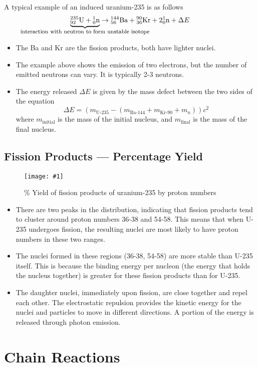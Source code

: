 \documentclass[a4paper,12pt]{article}
\let\oldsection\section
\renewcommand\section{\clearpage\oldsection}
\newcommand{\img}[4]{\begin{center}
  \begin{figure}[H]
    \centering
    \texttt{[image: \#1]}
    \caption{#3}
    \label{fig:#4}
  \end{figure}
\end{center}}
\newcommand{\paren}[1]{\left(#1\right)}
\newcommand{\atom}[3]{{}^{#1}_{#2}\text{#3}}
\begin{document}
A typical example of an induced uranium-235 is as follows
$$\underbrace{\atom{235}{92}{U} + \atom{1}{0}{n}}_\text{\makebox[0pt]{\footnotesize{interaction with neutron to form unstable isotope}}} \rightarrow \atom{144}{56}{Ba} + \atom{90}{36}{Kr} + 2\atom{1}{0}{n} + \Delta E$$
\begin{itemize}
  \item The Ba and Kr are the fission products, both have lighter nuclei.
  \item The example above shows the emission of two electrons, but the number of emitted neutrons can vary. It is typically 2-3 neutrons.
  \item The energy released $\Delta E$ is given by the mass defect between the two sides of the equation $$\Delta E = \paren{m_{\text{U-235}} - \paren{m_\text{Ba-144} + m_\text{Kr-90} + m_{n}}}c^2$$
        where $m_{\text{initial}}$ is the mass of the initial nucleus, and $m_{\text{final}}$ is the mass of the final nucleus.
\end{itemize}

\pagebreak

\subsection{Fission Products --- Percentage Yield}

\img{u235g.png}{0.5}{\% Yield of fission products of uranium-235 by proton numbers}{u235g}

\begin{itemize}
  \item There are two peaks in the distribution, indicating that fission products tend to cluster around proton numbers 36-38 and 54-58. This means that when U-235 undergoes fission, the resulting nuclei are most likely to have proton numbers in these two ranges.
  \item The nuclei formed in these regions (36-38, 54-58) are more stable than U-235 itself. This is because the binding energy per nucleon (the energy that holds the nucleus together) is greater for these fission products than for U-235.
  \item The daughter nuclei, immediately upon fission, are close together and repel each other. The electrostatic repulsion provides the kinetic energy for the nuclei and particles to move in different directions. A portion of the energy is released through photon emission.
\end{itemize}

\section{Chain Reactions}
\end{document}
